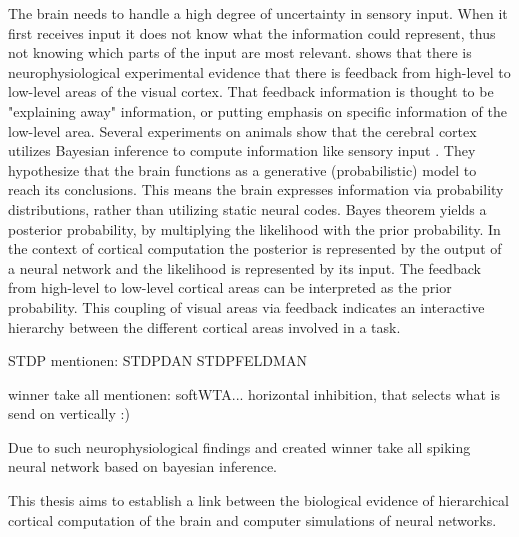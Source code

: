 The brain needs to handle a high degree of uncertainty in sensory input. When it first receives input it does not know what the information could represent, thus not knowing which parts of the input are most relevant. \citet{leeTS} shows that there is neurophysiological experimental evidence that there is feedback from high-level to low-level areas of the visual cortex. That feedback information is thought to be "explaining away" information, or putting emphasis on specific information of the low-level area.
Several experiments on animals show that the cerebral cortex utilizes Bayesian inference to compute information like sensory input \citep{neuralSubstrate, leeTS, anatomyOfInference}. They hypothesize that the brain functions as a generative (probabilistic) model to reach its conclusions. This means the brain expresses information via probability distributions, rather than utilizing static neural codes. Bayes theorem yields a posterior probability, by multiplying the likelihood with the prior probability. In the context of cortical computation the posterior is represented by the output of a neural network and the likelihood is represented by its input. The feedback from high-level to low-level cortical areas can be interpreted as the prior probability. This coupling of visual areas via feedback indicates an interactive hierarchy between the different cortical areas involved in a task.

STDP mentionen: STDPDAN STDPFELDMAN

winner take all mentionen: softWTA... horizontal inhibition, that selects what is send on vertically :)

Due to such neurophysiological findings \citet{nessler} and \citet{nesslerClone} created winner take all spiking neural network based on bayesian inference. 


This thesis aims to establish a link between the biological evidence of hierarchical cortical computation of the brain and computer simulations of neural networks. 